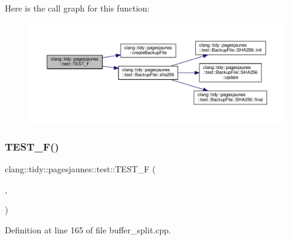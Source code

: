 Here is the call graph for this function\+:
\nopagebreak
\begin{figure}[H]
\begin{center}
\leavevmode
\includegraphics[width=350pt]{namespaceclang_1_1tidy_1_1pagesjaunes_1_1test_a5209433fceb796c949c6b3ce4a1ac56a_cgraph}
\end{center}
\end{figure}
\mbox{\label{namespaceclang_1_1tidy_1_1pagesjaunes_1_1test_a35ad2a928b471ce291df19fb21480d8e}} 
\subsubsection{\texorpdfstring{T\+E\+S\+T\+\_\+\+F()}{TEST\_F()}\hspace{0.1cm}{\footnotesize\ttfamily [39/57]}}
{\footnotesize\ttfamily clang\+::tidy\+::pagesjaunes\+::test\+::\+T\+E\+S\+T\+\_\+F (\begin{DoxyParamCaption}\item[{\hyperlink{classclang_1_1tidy_1_1pagesjaunes_1_1test_1_1_buffer_split_test}{Buffer\+Split\+Test}}]{,  }\item[{Big\+Buffers}]{ }\end{DoxyParamCaption})}



Definition at line 165 of file buffer\+\_\+split.\+cpp.

